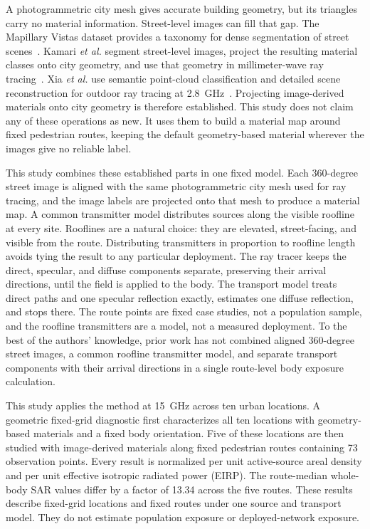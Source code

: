 \documentclass{ieeeaccess}
\begin{document}
A photogrammetric city mesh gives accurate building geometry, but its triangles
carry no material information. Street-level images can fill that gap. The
Mapillary Vistas dataset provides a taxonomy for dense segmentation of street
scenes~\cite{vistas}. Kamari \emph{et al.} segment street-level images, project
the resulting material classes onto city geometry, and use that geometry in
millimeter-wave ray tracing~\cite{mmsv}. Xia \emph{et al.} use semantic
point-cloud classification and detailed scene reconstruction for outdoor ray
tracing at 2.8~GHz~\cite{xia2024}. Projecting image-derived materials onto
city geometry is therefore established. This study does not claim any of these
operations as new. It uses them to build a material map around fixed pedestrian
routes, keeping the default geometry-based material wherever the images give no
reliable label.

This study combines these established parts in one fixed model. Each 360-degree
street image is aligned with the same photogrammetric city mesh used for ray
tracing, and the image labels are projected onto that mesh to produce a material map. A common transmitter model distributes sources along the visible
roofline at every site. Rooflines are a natural choice: they are elevated, street-facing, and visible
from the route. Distributing transmitters in proportion to roofline length
avoids tying the result to any particular deployment. The ray tracer keeps the direct, specular, and diffuse components separate,
preserving their arrival directions, until the field is applied to the body. The transport model treats direct paths and one
specular reflection exactly, estimates one diffuse reflection, and stops there.
The route points are fixed case studies, not a population sample, and the
roofline transmitters are a model, not a measured deployment. To the best of the authors' knowledge, prior work has not combined aligned
360-degree street images, a common roofline transmitter model, and separate
transport components with their arrival directions in a single route-level body
exposure calculation.

This study applies the method at 15~GHz across ten urban locations. A geometric
fixed-grid diagnostic first characterizes all ten locations with geometry-based
materials and a fixed body orientation. Five of these locations are then studied
with image-derived materials along fixed pedestrian routes containing 73
observation points. Every result is normalized per unit active-source areal
density and per unit effective isotropic radiated power (EIRP). The route-median
whole-body SAR values differ by a factor of 13.34 across the five routes. These
results describe fixed-grid locations and fixed routes under one source and
transport model. They do not estimate population exposure or deployed-network
exposure.
\end{document}
